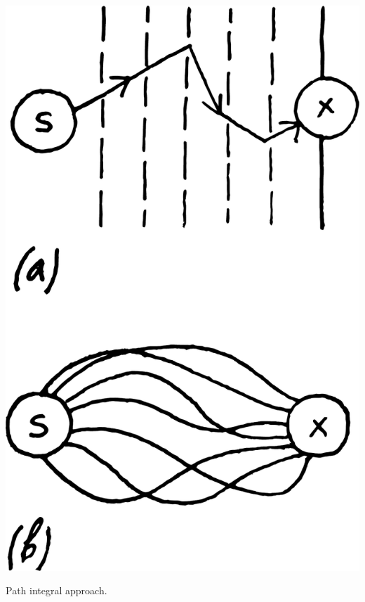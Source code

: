 \documentclass[a4paper,sfsidenotes,colorlinks=true]{tufte-book}
\numberwithin{equation}{section}
\numberwithin{figure}{section}
\begin{document}
\begin{marginfigure}[3cm]
\centering
\includegraphics[width=\textwidth]{figures/fig-09-04.pdf}
\caption{Path integral approach.}
\label{fig-9.4}
\end{marginfigure}
\end{document}
